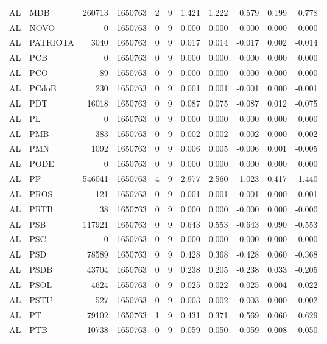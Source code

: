 \begin{landscape}
\begin{longtable}{llrrrrrrrrr}
AL & MDB & 260713 & 1650763 & 2 & 9 & 1.421 & 1.222 & 0.579 & 0.199 & 0.778 \\
AL & NOVO & 0 & 1650763 & 0 & 9 & 0.000 & 0.000 & 0.000 & 0.000 & 0.000 \\
AL & PATRIOTA & 3040 & 1650763 & 0 & 9 & 0.017 & 0.014 & -0.017 & 0.002 & -0.014 \\
AL & PCB & 0 & 1650763 & 0 & 9 & 0.000 & 0.000 & 0.000 & 0.000 & 0.000 \\
AL & PCO & 89 & 1650763 & 0 & 9 & 0.000 & 0.000 & -0.000 & 0.000 & -0.000 \\
AL & PCdoB & 230 & 1650763 & 0 & 9 & 0.001 & 0.001 & -0.001 & 0.000 & -0.001 \\
AL & PDT & 16018 & 1650763 & 0 & 9 & 0.087 & 0.075 & -0.087 & 0.012 & -0.075 \\
AL & PL & 0 & 1650763 & 0 & 9 & 0.000 & 0.000 & 0.000 & 0.000 & 0.000 \\
AL & PMB & 383 & 1650763 & 0 & 9 & 0.002 & 0.002 & -0.002 & 0.000 & -0.002 \\
AL & PMN & 1092 & 1650763 & 0 & 9 & 0.006 & 0.005 & -0.006 & 0.001 & -0.005 \\
AL & PODE & 0 & 1650763 & 0 & 9 & 0.000 & 0.000 & 0.000 & 0.000 & 0.000 \\
AL & PP & 546041 & 1650763 & 4 & 9 & 2.977 & 2.560 & 1.023 & 0.417 & 1.440 \\
AL & PROS & 121 & 1650763 & 0 & 9 & 0.001 & 0.001 & -0.001 & 0.000 & -0.001 \\
AL & PRTB & 38 & 1650763 & 0 & 9 & 0.000 & 0.000 & -0.000 & 0.000 & -0.000 \\
AL & PSB & 117921 & 1650763 & 0 & 9 & 0.643 & 0.553 & -0.643 & 0.090 & -0.553 \\
AL & PSC & 0 & 1650763 & 0 & 9 & 0.000 & 0.000 & 0.000 & 0.000 & 0.000 \\
AL & PSD & 78589 & 1650763 & 0 & 9 & 0.428 & 0.368 & -0.428 & 0.060 & -0.368 \\
AL & PSDB & 43704 & 1650763 & 0 & 9 & 0.238 & 0.205 & -0.238 & 0.033 & -0.205 \\
AL & PSOL & 4624 & 1650763 & 0 & 9 & 0.025 & 0.022 & -0.025 & 0.004 & -0.022 \\
AL & PSTU & 527 & 1650763 & 0 & 9 & 0.003 & 0.002 & -0.003 & 0.000 & -0.002 \\
AL & PT & 79102 & 1650763 & 1 & 9 & 0.431 & 0.371 & 0.569 & 0.060 & 0.629 \\
AL & PTB & 10738 & 1650763 & 0 & 9 & 0.059 & 0.050 & -0.059 & 0.008 & -0.050 \\

\end{longtable}
\end{landscape}
